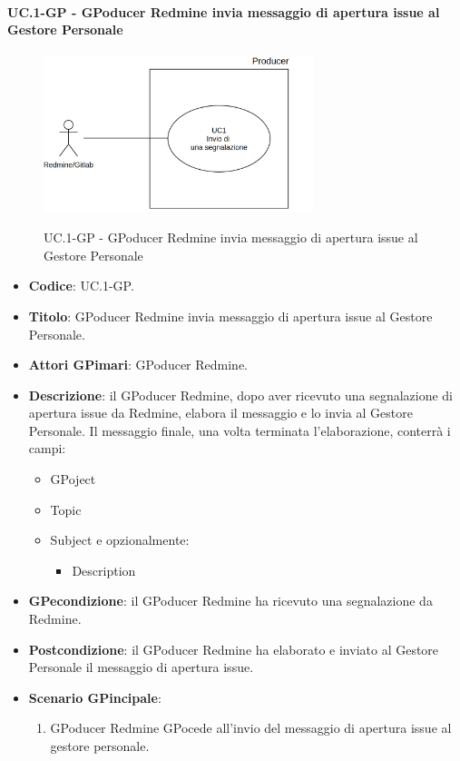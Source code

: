 		\paragraph{UC\theuccount.1-GP - GPoducer Redmine invia messaggio di apertura issue al Gestore Personale}
		\begin{figure}[H]
			\centering
			\includegraphics[width=0.7\textwidth]{img/UC1.png}\\
			\caption{UC\theuccount.1-GP - GPoducer Redmine invia messaggio di apertura issue al Gestore Personale}
		\end{figure}
		\begin{itemize}
			\item \textbf{Codice}: UC\theuccount.1-GP.
			\item \textbf{Titolo}: GPoducer Redmine invia messaggio di apertura issue al Gestore Personale.
			\item \textbf{Attori GPimari}: GPoducer Redmine.
			\item \textbf{Descrizione}: il GPoducer Redmine, dopo aver
			ricevuto una segnalazione di apertura issue da Redmine, elabora
			il messaggio e lo invia al Gestore Personale.
			Il messaggio finale, una volta terminata l'elaborazione, conterrà i campi:
			\begin{itemize}
				\item GPoject
				\item Topic
				\item Subject e opzionalmente:
				\begin{itemize}
					\item Description
				\end{itemize}
			\end{itemize}
			\item \textbf{GPecondizione}: il GPoducer Redmine ha ricevuto una segnalazione da Redmine.
			\item \textbf{Postcondizione}: il GPoducer Redmine ha elaborato e inviato al Gestore Personale il messaggio di apertura issue.
			\item \textbf{Scenario GPincipale}: 
			\begin{enumerate}
				\item GPoducer Redmine GPocede all'invio del messaggio di
				apertura issue al gestore personale.
			\end{enumerate}
			
		\end{itemize}
		
